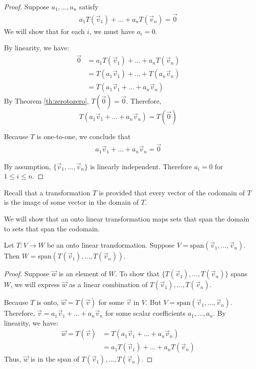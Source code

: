 \documentclass{ximera}
\begin{document}
\begin{proof}
Suppose $a_1, \ldots, a_n$ satisfy
\begin{align}\label{onlysolution}a_1T(\vec{v}_1)+\ldots +a_nT(\vec{v}_n)=\vec{0}\end{align}
We will show that for each $i$, we must have $a_i=0$.

By linearity, we have:
\begin{align*}\vec{0}&=a_1T(\vec{v}_1)+\ldots +a_nT(\vec{v}_n)\\
&=T(a_1\vec{v}_1)+\ldots +T(a_n\vec{v}_n)\\
&=T(a_1\vec{v}_1+\ldots +a_n\vec{v}_n)
\end{align*}
By Theorem \ref{th:zerotozero}, $T(\vec{0})=\vec{0}$.  Therefore,
$$T(a_1\vec{v}_1+\ldots +a_n\vec{v}_n)=T(\vec{0})$$

Because $T$ is one-to-one, we conclude that 
\begin{align}\label{onlytrivial}a_1\vec{v}_1+\ldots +a_n\vec{v}_n=\vec{0}\end{align}


By assumption, $\{\vec{v}_1,\ldots,\vec{v}_n\}$ is linearly independent.  Therefore $a_i=0$ for $1\leq i\leq n$.  
\end{proof}

Recall that a transformation $T$ is  provided that every vector of the codomain of $T$ is the image of some vector in the domain of $T$.  

We will show that an onto linear transformation maps sets that span the domain to sets that span the codomain. 

\begin{theorem}\label{th:ontospan}
Let $T:V\rightarrow W$ be an onto linear transformation.  Suppose $V=\mbox{span}(\vec{v}_1,\ldots ,\vec{v}_n)$.  Then $W=\mbox{span}(T(\vec{v}_1),\ldots ,T(\vec{v}_n))$.
\end{theorem}
\begin{proof}
Suppose $\vec{w}$ is an element of $W$. To show that $\{T(\vec{v}_1),\ldots ,T(\vec{v}_n)\}$ spans $W$, we will express $\vec{w}$ as a linear combination of $T(\vec{v}_1),\ldots ,T(\vec{v}_n)$.

Because $T$ is onto, $\vec{w}=T(\vec{v})$ for some $\vec{v}$ in $V$.  But $V=\mbox{span}(\vec{v}_1,\ldots ,\vec{v}_n)$.  Therefore, $\vec{v}=a_1\vec{v}_1+\ldots +a_n\vec{v}_n$ for some scalar coefficients $a_1,\ldots ,a_n$.
By linearity, we have:
\begin{align*}
\vec{w}=T(\vec{v})&=T(a_1\vec{v}_1+\ldots +a_n\vec{v}_n)\\
&=a_1T(\vec{v}_1)+\ldots +a_nT(\vec{v}_n)
\end{align*}
Thus, $\vec{w}$ is in the span of $T(\vec{v}_1),\ldots ,T(\vec{v}_n)$.
\end{proof}
 
\end{document}
